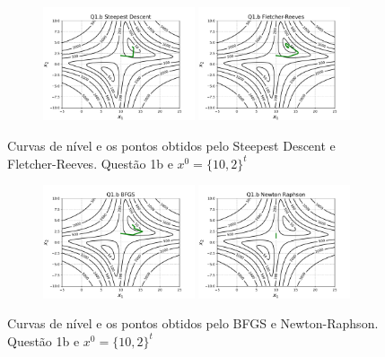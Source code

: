 \documentclass[10pt, a4paper]{article}
\begin{document}
\begin{figure}[H]
  \centering
  \begin{subfigure}[b]{\textwidth}
    \includegraphics[width=0.49\textwidth]{figuras/Q1.b_Steepest Descent_P0=[10e2].pdf}
    \includegraphics[width=0.49\textwidth]{figuras/Q1.b_Fletcher-Reeves_P0=[10e2].pdf}
  \end{subfigure}
  \caption{Curvas de nível e os pontos obtidos pelo Steepest Descent e Fletcher-Reeves. Questão 1b e $x^0 = \{10,2\}^t$}
\end{figure}

\begin{figure}[H]
  \centering
  \begin{subfigure}[b]{\textwidth}
    \includegraphics[width=0.49\textwidth]{figuras/Q1.b_BFGS_P0=[10e2].pdf}
    \includegraphics[width=0.49\textwidth]{figuras/Q1.b_Newton Raphson_P0=[10e2].pdf}
  \end{subfigure}
  \caption{Curvas de nível e os pontos obtidos pelo BFGS e Newton-Raphson. Questão 1b e $x^0 = \{10,2\}^t$}
\end{figure}
\end{document}
